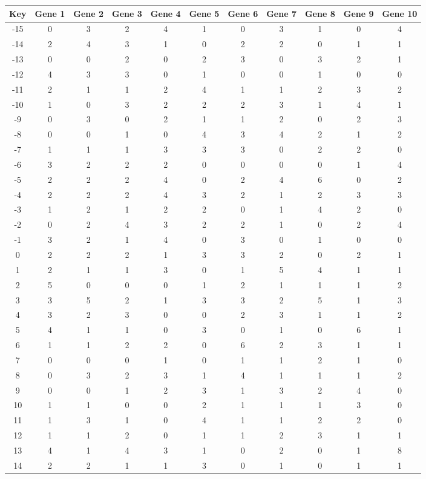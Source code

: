 \begin{tabular}{|c|c|c|c|c|c|c|c|c|c|c|}
\hline
Key & Gene 1 & Gene 2 & Gene 3 & Gene 4 & Gene 5 & Gene 6 & Gene 7 & Gene 8 & Gene 9 & Gene 10 \\
\hline
-15 & 0 & 3 & 2 & 4 & 1 & 0 & 3 & 1 & 0 & 4 \\
-14 & 2 & 4 & 3 & 1 & 0 & 2 & 2 & 0 & 1 & 1 \\
-13 & 0 & 0 & 2 & 0 & 2 & 3 & 0 & 3 & 2 & 1 \\
-12 & 4 & 3 & 3 & 0 & 1 & 0 & 0 & 1 & 0 & 0 \\
-11 & 2 & 1 & 1 & 2 & 4 & 1 & 1 & 2 & 3 & 2 \\
-10 & 1 & 0 & 3 & 2 & 2 & 2 & 3 & 1 & 4 & 1 \\
-9 & 0 & 3 & 0 & 2 & 1 & 1 & 2 & 0 & 2 & 3 \\
-8 & 0 & 0 & 1 & 0 & 4 & 3 & 4 & 2 & 1 & 2 \\
-7 & 1 & 1 & 1 & 3 & 3 & 3 & 0 & 2 & 2 & 0 \\
-6 & 3 & 2 & 2 & 2 & 0 & 0 & 0 & 0 & 1 & 4 \\
-5 & 2 & 2 & 2 & 4 & 0 & 2 & 4 & 6 & 0 & 2 \\
-4 & 2 & 2 & 2 & 4 & 3 & 2 & 1 & 2 & 3 & 3 \\
-3 & 1 & 2 & 1 & 2 & 2 & 0 & 1 & 4 & 2 & 0 \\
-2 & 0 & 2 & 4 & 3 & 2 & 2 & 1 & 0 & 2 & 4 \\
-1 & 3 & 2 & 1 & 4 & 0 & 3 & 0 & 1 & 0 & 0 \\
0 & 2 & 2 & 2 & 1 & 3 & 3 & 2 & 0 & 2 & 1 \\
1 & 2 & 1 & 1 & 3 & 0 & 1 & 5 & 4 & 1 & 1 \\
2 & 5 & 0 & 0 & 0 & 1 & 2 & 1 & 1 & 1 & 2 \\
3 & 3 & 5 & 2 & 1 & 3 & 3 & 2 & 5 & 1 & 3 \\
4 & 3 & 2 & 3 & 0 & 0 & 2 & 3 & 1 & 1 & 2 \\
5 & 4 & 1 & 1 & 0 & 3 & 0 & 1 & 0 & 6 & 1 \\
6 & 1 & 1 & 2 & 2 & 0 & 6 & 2 & 3 & 1 & 1 \\
7 & 0 & 0 & 0 & 1 & 0 & 1 & 1 & 2 & 1 & 0 \\
8 & 0 & 3 & 2 & 3 & 1 & 4 & 1 & 1 & 1 & 2 \\
9 & 0 & 0 & 1 & 2 & 3 & 1 & 3 & 2 & 4 & 0 \\
10 & 1 & 1 & 0 & 0 & 2 & 1 & 1 & 1 & 3 & 0 \\
11 & 1 & 3 & 1 & 0 & 4 & 1 & 1 & 2 & 2 & 0 \\
12 & 1 & 1 & 2 & 0 & 1 & 1 & 2 & 3 & 1 & 1 \\
13 & 4 & 1 & 4 & 3 & 1 & 0 & 2 & 0 & 1 & 8 \\
14 & 2 & 2 & 1 & 1 & 3 & 0 & 1 & 0 & 1 & 1 \\
\hline
\end{tabular}